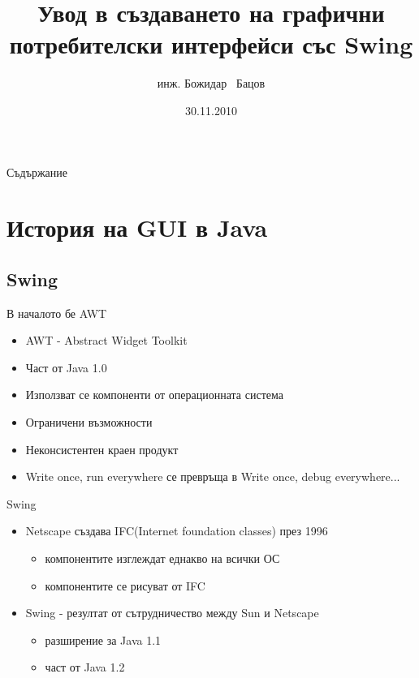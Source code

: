 \documentclass{beamer}
\title{Увод в създаването на графични потребителски интерфейси със Swing}
\author{инж. Божидар ~Бацов}
\institute{Drow Ltd.}
\date{30.11.2010}
\begin{document}
\begin{frame}
  \titlepage
\end{frame}

\begin{frame}{Съдържание}
  \tableofcontents[pausesections]
\end{frame}

\section{История на GUI в Java}

\subsection{Swing}

\begin{frame}{В началото бе AWT}
  \begin{itemize}
  \item AWT - Abstract Widget Toolkit
  \item Част от Java 1.0
  \item Използват се компоненти от операционната система
  \item Ограничени възможности
  \item Неконсистентен краен продукт
  \item Write once, run everywhere се превръща в Write once, debug everywhere...
  \end{itemize}
\end{frame}

\begin{frame}{Swing}
  \transdissolve
  \begin{itemize}
  \item Netscape създава IFC(Internet foundation classes) през 1996
    \begin{itemize}
      \item компонентите изглеждат еднакво на всички ОС
      \item компонентите се рисуват от IFC
    \end{itemize}
  \item Swing - резултат от сътрудничество между Sun и Netscape
    \begin{itemize}
      \item разширение за Java 1.1
      \item част от Java 1.2
    \end{itemize}

  \end{itemize}
\end{frame}
\end{document}
